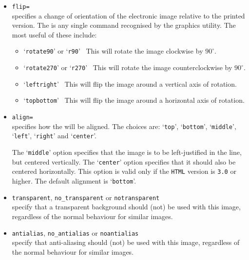\begin{itemize}
\item \texttt{flip=}\\
specifies a change of orientation of the
electronic image relative to the printed version.
The  is any single command recognised by
the  graphics utility.
The most useful of these include:
\begin{itemize}
%
\item `\texttt{rotate90}' or `\texttt{r90}'~
This will rotate the image clockwise by $90^\circ$.
%
\item `\texttt{rotate270}' or `\texttt{r270}'~
This will rotate the image counterclockwise by $90^\circ$.
%
\item `\texttt{leftright}'~ 
This will flip the image around a vertical axis of rotation.
%
\item `\texttt{topbottom}'~
This will flip the image around a horizontal axis of rotation.
\end{itemize}
%
%
%
\item \texttt{align=}\\
specifies how the  will be aligned.  
The choices are:  
`\texttt{top}', `\texttt{bottom}', `\texttt{middle}', `\texttt{left}', 
`\texttt{right}' and `\texttt{center}'.

The `\texttt{middle}' option specifies that the image is to be
left-justified in the line, but centered vertically.  
The `\texttt{center}' option specifies that it should also 
be centered horizontally. 
This option is valid only if the \texttt{HTML} version 
is \texttt{3.0} or higher.
The default alignment is `\texttt{bottom}'.%

%
%
%
\item \texttt{transparent}, \texttt{no\_transparent}
 or \texttt{notransparent}\\
specify that a transparent background should (not) be used with this image,
regardless of the normal behaviour for similar images.

%
%
\item \texttt{antialias}, \texttt{no\_antialias}
 or \texttt{noantialias}\\
specify that anti-aliasing should (not) be used with this image,
regardless of the normal behaviour for similar images.


\end{itemize}
